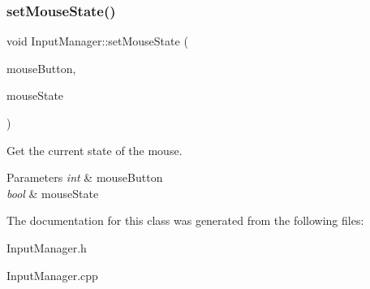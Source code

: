 \subsubsection{\texorpdfstring{set\+Mouse\+State()}{setMouseState()}}
{\footnotesize\ttfamily void Input\+Manager\+::set\+Mouse\+State (\begin{DoxyParamCaption}\item[{int}]{mouse\+Button,  }\item[{bool}]{mouse\+State }\end{DoxyParamCaption})}



Get the current state of the mouse. 


\begin{DoxyParams}{Parameters}
{\em int} & mouse\+Button \\
\hline
{\em bool} & mouse\+State \\
\hline
\end{DoxyParams}


The documentation for this class was generated from the following files\+:\begin{DoxyCompactItemize}
\item 
Input\+Manager.\+h\item 
Input\+Manager.\+cpp\end{DoxyCompactItemize}
